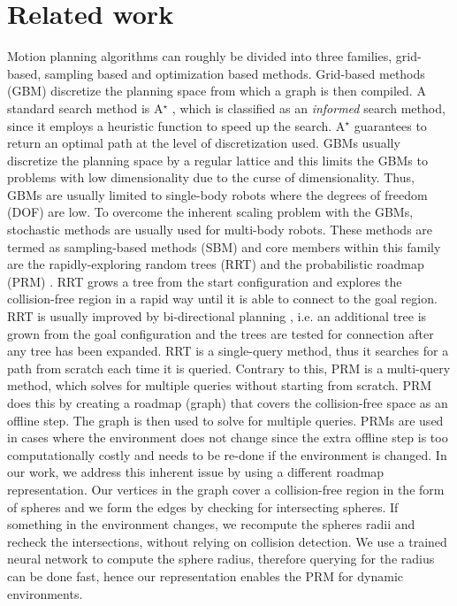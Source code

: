 \documentclass[../main.tex]{subfiles}
\begin{document}
\section{Related work}
Motion planning algorithms can roughly be divided into three families, grid-based, sampling based and optimization based methods. Grid-based methods (GBM) discretize the planning space from which a graph is then compiled. A standard search method is A$^\star$ \citep{a_star}, which is classified as an \textit{informed} search method, since it employs a heuristic function to speed up the search. A$^\star$ guarantees to return an optimal path at the level of discretization used. GBMs usually discretize the planning space by a regular lattice and this limits the GBMs to problems with low dimensionality due to the curse of dimensionality. Thus, GBMs are usually limited to single-body robots where the degrees of freedom (DOF) are low. To overcome the inherent scaling problem with the GBMs, stochastic methods are usually used for multi-body robots. These methods are termed as sampling-based methods (SBM) and core members within this family are the rapidly-exploring random trees (RRT) \citep{rrt} and the probabilistic roadmap (PRM) \citep{prm}. RRT grows a tree from the start configuration and explores the collision-free region in a rapid way until it is able to connect to the goal region. RRT is usually improved by bi-directional planning \citep{rrt_connect}, i.e. an additional tree is grown from the goal configuration and the trees are tested for connection after any tree has been expanded. RRT is a single-query method, thus it searches for a path from scratch each time it is queried. Contrary to this, PRM is a multi-query method, which solves for multiple queries without starting from scratch. PRM does this by creating a roadmap (graph) that covers the collision-free space as an offline step. The graph is then used to solve for multiple queries. PRMs are used in cases where the environment does not change since the extra offline step is too computationally costly and needs to be re-done if the environment is changed. In our work, we address this inherent issue by using a different roadmap representation. Our vertices in the graph cover a collision-free region in the form of spheres and we form the edges by checking for intersecting spheres. If something in the environment changes, we recompute the spheres radii and recheck the intersections, without relying on collision detection. We use a trained neural network to compute the sphere radius, therefore querying for the radius can be done fast, hence our representation enables the PRM for dynamic environments.
\end{document}
